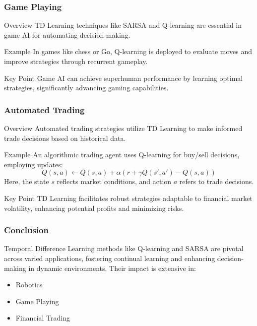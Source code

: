 \documentclass[aspectratio=169]{beamer}
\begin{document}
\begin{frame}[fragile]
    \frametitle{Game Playing}
    \begin{block}{Overview}
        TD Learning techniques like SARSA and Q-learning are essential in game AI for automating decision-making.
    \end{block}
    \begin{exampleblock}{Example}
        In games like chess or Go, Q-learning is deployed to evaluate moves and improve strategies through recurrent gameplay.
    \end{exampleblock}
    \begin{block}{Key Point}
        Game AI can achieve superhuman performance by learning optimal strategies, significantly advancing gaming capabilities.
    \end{block}
\end{frame}

\begin{frame}[fragile]
    \frametitle{Automated Trading}
    \begin{block}{Overview}
        Automated trading strategies utilize TD Learning to make informed trade decisions based on historical data.
    \end{block}
    \begin{exampleblock}{Example}
        An algorithmic trading agent uses Q-learning for buy/sell decisions, employing updates:
        \begin{equation}
            Q(s, a) \leftarrow Q(s, a) + \alpha \left( r + \gamma Q(s', a') - Q(s, a) \right)
        \end{equation}
        Here, the state $s$ reflects market conditions, and action $a$ refers to trade decisions.
    \end{exampleblock}
    \begin{block}{Key Point}
        TD Learning facilitates robust strategies adaptable to financial market volatility, enhancing potential profits and minimizing risks.
    \end{block}
\end{frame}

\begin{frame}[fragile]
    \frametitle{Conclusion}
    Temporal Difference Learning methods like Q-learning and SARSA are pivotal across varied applications, fostering continual learning and enhancing decision-making in dynamic environments. Their impact is extensive in:
    \begin{itemize}
        \item Robotics
        \item Game Playing
        \item Financial Trading
    \end{itemize}
\end{frame}
\end{document}

